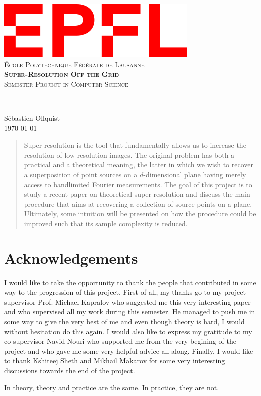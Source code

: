 \documentclass[11pt,titlepage]{report}
\begin{document}
\begin{titlepage}
	\centering
    \includegraphics[width=0.5\linewidth]{images/EPFL.png}\\[0.25cm] 	%
    \textsc{\LARGE École Polytechnique Fédérale de Lausanne}\\ \vspace{\fill}
    \textbf{\textsc{\fontsize{30}{30}\selectfont Super-Resolution Off the Grid}}\\ \vspace{\fill}		
	\textsc{\LARGE Semester Project in Computer Science}\\[0.4cm]
	\rule{\linewidth}{0.2 mm} \\[0.5 cm]
	Sébastien Ollquist \\[2cm] \today
\end{titlepage}
\restoregeometry

\thispagestyle{numberonly}
\begin{abstract}
    Super-resolution is the tool that fundamentally allows us to increase the resolution of low resolution images. The original problem has both a practical and a theoretical meaning, the latter in which we wish to recover a superposition of point sources on a $d$-dimensional plane having merely access to bandlimited Fourier measurements. The goal of this project is to study a recent paper on theoretical super-resolution and discuss the main procedure that aims at recovering a collection of source points on a plane. Ultimately, some intuition will be presented on how the procedure could be improved such that its sample complexity is reduced.
\end{abstract}
\chapter*{Acknowledgements}
I would like to take the opportunity to thank the people that contributed in some way to the progression of this project. First of all, my thanks go to my project supervisor Prof. Michael Kapralov who suggested me this very interesting paper and who supervised all my work during this semester. He managed to push me in some way to give the very best of me and even though theory is hard, I would without hesitation do this again. I would also like to express my gratitude to my co-supervisor Navid Nouri who supported me from the very begining of the project and who gave me some very helpful advice all along. Finally, I would like to thank Kshiteej Sheth and Mikhail Makarov for some very interesting discussions towards the end of the project.
\begin{fquote}
    In theory, theory and practice are the same. In practice, they are not.
\end{fquote} 
\newpage
\end{document}
